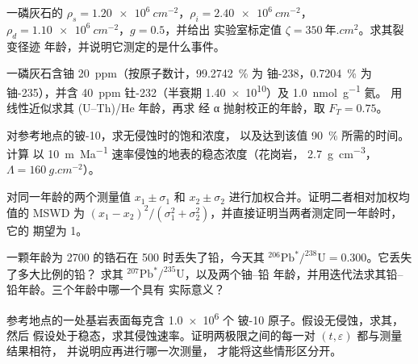 \begin{exercise}[$\star\star$]\label{exo:b3:advanced-geochronology:7}
一磷灰石的 $\rho_s = \qty{1.20e6}{cm^{-2}}$，$\rho_i =
\qty{2.40e6}{cm^{-2}}$，$\rho_d = \qty{1.10e6}{cm^{-2}}$，$g = 0.5$，并给出
实验室标定值 $\zeta = \qty{350}{\text{年}.cm^2}$。求其裂变径迹
年龄，并说明它测定的是什么事件。
\end{exercise}

\begin{exercise}[$\star\star$]\label{exo:b3:advanced-geochronology:8}
一磷灰石含铀 \qty{20}{ppm}（按原子数计，\qty{99.2742}{\percent} 为
铀-238，\qty{0.7204}{\percent} 为铀-235），并含 \qty{40}{ppm}
钍-232（半衰期 \qty{1.40e10}{}）及 \qty{1.0}{nmol.g^{-1}} 氦。
用线性近似求其 (U–Th)/He 年龄，再求
经 α 抛射校正的年龄，取 $F_T = 0.75$。
\end{exercise}

\begin{exercise}[$\star\star$]\label{exo:b3:advanced-geochronology:9}
对参考地点的铍-10，求无侵蚀时的饱和浓度，
以及达到该值 \qty{90}{\percent} 所需的时间。计算
以 \qty{10}{m.Ma^{-1}} 速率侵蚀的地表的稳态浓度（花岗岩，
\qty{2.7}{g.cm^{-3}}，$\Lambda = \qty{160}{g.cm^{-2}}$）。
\end{exercise}

\begin{exercise}[$\star\star\star$]\label{exo:b3:advanced-geochronology:10}
对同一年龄的两个测量值 $x_1 \pm \sigma_1$ 和 $x_2 \pm \sigma_2$
进行加权合并。证明二者相对加权均值的 MSWD 为
$(x_1 - x_2)^2/(\sigma_1^2 + \sigma_2^2)$，并直接证明当两者测定同一年龄时，它的
期望为 1。
\end{exercise}

\begin{exercise}[$\star\star\star$]\label{exo:b3:advanced-geochronology:11}
一颗年龄为 \qty{2700}{\Ma} 的锆石在 \qty{500}{\Ma} 时丢失了铅，今天其
$^{206}\mathrm{Pb}^*/^{238}\mathrm{U} = 0.300$。它丢失了多大比例的铅？
求其 $^{207}\mathrm{Pb}^*/^{235}\mathrm{U}$，以及两个铀–铅
年龄，并用迭代法求其铅–铅年龄。三个年龄中哪一个具有
实际意义？
\end{exercise}

\begin{exercise}[$\star\star\star$]\label{exo:b3:advanced-geochronology:12}
参考地点的一处基岩表面每克含 \num{1.0e6} 个
铍-10 原子。假设无侵蚀，求其，然后
假设处于稳态，求其侵蚀速率。证明两极限之间的每一对 $(t, \varepsilon)$ 都与测量结果相符，
并说明应再进行哪一次测量，
才能将这些情形区分开。
\end{exercise}

